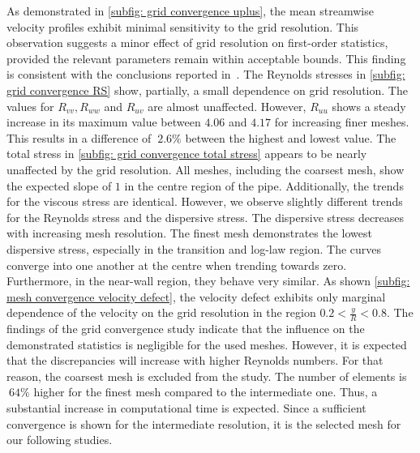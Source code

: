 As demonstrated in \autoref{subfig: grid convergence uplus},
the mean streamwise velocity profiles   exhibit minimal sensitivity to  the grid resolution. This observation  suggests a  minor effect of grid resolution on first-order statistics, provided the relevant parameters remain within acceptable bounds. This  finding is consistent with the conclusions reported in~\citep{moinDIRECTNUMERICALSIMULATION1998}.
The Reynolds stresses in \autoref{subfig: grid convergence RS} show, partially, a small dependence on grid resolution.
The values for $R_{vv}, R_{ww}$ and $R_{uv}$ are almost unaffected.
However, $R_{uu}$ shows a steady increase in its maximum value between $4.06$ and $4.17$ for increasing finer meshes.
This results in a difference of $~ 2.6\%$ between the highest and lowest value.
The total stress in \autoref{subfig: grid convergence total stress} appears to be nearly unaffected by the grid resolution. 
All meshes, including the coarsest mesh, show the expected slope of $1$ in the centre region of the pipe.
Additionally, the trends for the viscous stress are identical.
However, we observe slightly different trends for the Reynolds stress and the dispersive stress.
The dispersive stress decreases with increasing mesh resolution.
The finest mesh demonstrates the lowest dispersive stress, especially in the transition and log-law region. 
The curves converge into one another at the centre  when trending towards zero.
Furthermore, in the near-wall region, they behave very similar.
As shown \autoref{subfig: mesh convergence velocity defect}, the velocity defect  exhibits  only marginal dependence of the velocity on the grid resolution in the region $ 0.2 < \frac{y}{R} < 0.8$. 
The findings of the grid convergence study indicate that the influence on the demonstrated statistics is negligible for  the used meshes.
However, it is expected that the discrepancies will increase  with higher Reynolds numbers.
For that reason, the coarsest mesh is excluded from the study. 
The number of elements is $~64\%$ higher for the finest mesh compared to the intermediate one. Thus, a substantial increase in computational time is expected.
Since a sufficient convergence is shown for the intermediate resolution, it is the selected mesh for our following studies.

